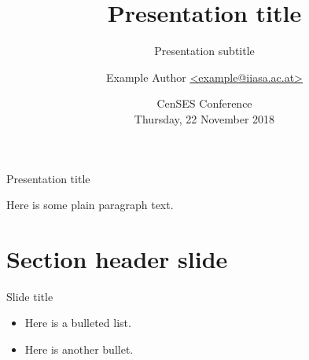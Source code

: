 \documentclass[aspectratio=169]{beamer}
\title{Presentation title}
\subtitle{Presentation subtitle}
\author{Example Author \href{mailto:example@iiasa.ac.at}{\ttfamily <example@iiasa.ac.at>}}
\date{CenSES Conference \\ Thursday, 22 November 2018}
\begin{document}
\maketitle

\begin{frame}{Presentation title}

Here is some plain paragraph text.

\end{frame}

\section{Section header slide}

\begin{frame}{Slide title}

\begin{itemize}
  \item Here is a bulleted list.
  \item Here is another bullet.
\end{itemize}

\end{frame}
\end{document}
